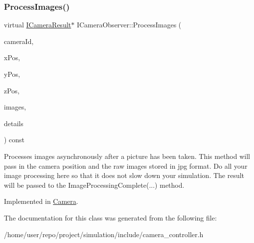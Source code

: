 \subsubsection{\texorpdfstring{Process\+Images()}{ProcessImages()}}
{\footnotesize\ttfamily virtual \hyperlink{classICameraResult}{I\+Camera\+Result}$\ast$ I\+Camera\+Observer\+::\+Process\+Images (\begin{DoxyParamCaption}\item[{int}]{camera\+Id,  }\item[{double}]{x\+Pos,  }\item[{double}]{y\+Pos,  }\item[{double}]{z\+Pos,  }\item[{const std\+::vector$<$ \hyperlink{structRawCameraImage}{Raw\+Camera\+Image} $>$ \&}]{images,  }\item[{picojson\+::object \&}]{details }\end{DoxyParamCaption}) const\hspace{0.3cm}{\ttfamily [pure virtual]}}

Processes images asynchronously after a picture has been taken. This method will pass in the camera position and the raw images stored in jpg format. Do all your image processing here so that it does not slow down your simulation. The result will be passed to the Image\+Processing\+Complete(...) method. 

Implemented in \hyperlink{classCamera_a792611ad34a1c595b61b7c72ce1d5e32}{Camera}.



The documentation for this class was generated from the following file\+:\begin{DoxyCompactItemize}
\item 
/home/user/repo/project/simulation/include/camera\+\_\+controller.\+h\end{DoxyCompactItemize}
